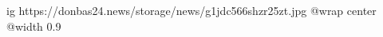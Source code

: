  
 
 
 
 

\ifcmt
  ig https://donbas24.news/storage/news/g1jdc566shzr25zt.jpg
  @wrap center
  @width 0.9
\fi
